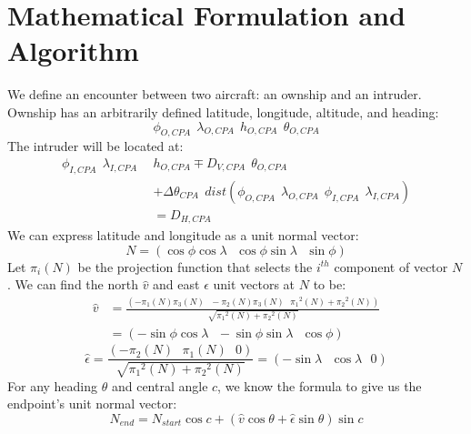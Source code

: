 \chapter{Mathematical Formulation and Algorithm}
\label{chap:math}

We define an encounter between two aircraft: an ownship and an intruder. Ownship has an arbitrarily defined latitude, longitude, altitude, and heading:
\begin{equation}
    \phi_{O,CPA} \ \ \lambda_{O,CPA} \ \ h_{O,CPA} \ \ \theta_{O,CPA}
\end{equation}
The intruder will be located at:
\begin{equation}
    \begin{aligned}
        \phi_{I,CPA} \ \ \lambda_{I,CPA} \ \ &h_{O,CPA} \mp D_{V,CPA} \ \ \theta_{O,CPA} \\
        &+ \Delta \theta_{CPA} \ \ dist(\phi_{O,CPA} \ \ \lambda_{O,CPA} \ \ \phi_{I,CPA} \ \ \lambda_{I,CPA}) \\
        &= D_{H,CPA}
    \end{aligned}
\end{equation}
We can express latitude and longitude as a unit normal vector:
\begin{equation}
    N = (\cos{\phi}\cos{\lambda} \ \ \ \cos{\phi}\sin{\lambda} \ \ \ \sin{\phi})
\end{equation}
Let \(\pi_{i}(N)\) be the projection function that selects the \(i^{th}\) component of vector \(N\). We can find the north \(\hat{v}\) and east \(\hat{\epsilon}\) unit vectors at \(N\) to be:
\begin{equation}
    \begin{aligned}
        \hat{v} &= \frac{(-\pi_{1}(N)\pi_{3}(N) \ \ \ -\pi_{2}(N)\pi_{3}(N) \ \ \ \pi_{1}{}^{2}(N) + \pi_{2}{}^{2}(N))}{\sqrt{\pi_{1}{}^{2}(N)+\pi_{2}{}^{2}(N)}} \\
        &= (-\sin{\phi}\cos{\lambda} \ \ \ -\sin{\phi}\sin{\lambda} \ \ \ \cos{\phi})
    \end{aligned}
\end{equation}
\begin{equation}
    \hat{\epsilon} = \frac{(-\pi_{2}(N) \ \ \ \pi_{1}(N) \ \ \ 0)}{\sqrt{\pi_{1}{}^{2}(N)+\pi_{2}{}^{2}(N)}} = (-\sin{\lambda} \ \ \ \cos{\lambda} \ \ \ 0)
\end{equation}
For any heading \(\theta\) and central angle \(c\), we know the formula to give us the endpoint’s unit normal vector:
\begin{equation}
    N_{end} = N_{start}\cos{c} + (\hat{v}\cos{\theta} + \hat{\epsilon}\sin{\theta})\sin{c}
\end{equation}
